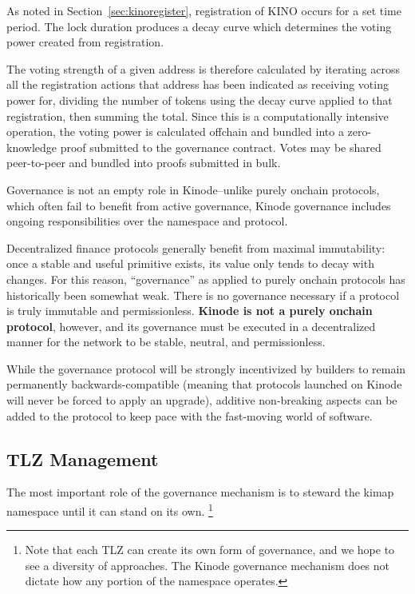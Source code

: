 \documentclass[runningheads]{llncs}
\begin{document}
As noted in Section~\ref{sec:kinoregister}, registration of KINO occurs for a set time period.
The lock duration produces a decay curve which determines the voting power created from registration.

The voting strength of a given address is therefore calculated by iterating across all the registration actions that address has been indicated as receiving voting power for, dividing the number of tokens using the decay curve applied to that registration, then summing the total.
Since this is a computationally intensive operation, the voting power is calculated offchain and bundled into a zero-knowledge proof submitted to the governance contract.
Votes may be shared peer-to-peer and bundled into proofs submitted in bulk.

Governance is not an empty role in Kinode–unlike purely onchain protocols, which often fail to benefit from active governance, Kinode governance includes ongoing responsibilities over the namespace and protocol.

Decentralized finance protocols generally benefit from maximal immutability: once a stable and useful primitive exists, its value only tends to decay with changes.
For this reason, ``governance'' as applied to purely onchain protocols has historically been somewhat weak.
There is no governance necessary if a protocol is truly immutable and permissionless. \textbf{Kinode is not a purely onchain protocol}, however, and its governance must be executed in a decentralized manner for the network to be stable, neutral, and permissionless.

While the governance protocol will be strongly incentivized by builders to remain permanently backwards-compatible (meaning that protocols launched on Kinode will never be forced to apply an upgrade), additive non-breaking aspects can be added to the protocol to keep pace with the fast-moving world of software.

\subsection{TLZ Management}
\label{sec:daotlzmanagement}

The most important role of the governance mechanism is to steward the kimap namespace until it can stand on its own.
\footnote{Note that each TLZ can create its own form of governance, and we hope to see a diversity of approaches. The Kinode governance mechanism does not dictate how any portion of the namespace operates.}
\end{document}
